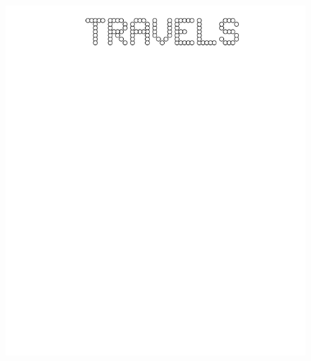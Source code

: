 \documentclass[17pt]{extreport}
\begin{document}
	 \begin{figure}
		\centering
		\includegraphics[width=6.25in]{imageserver/uploadimages/travels.png}
	\end{figure}
	
\end{document}
